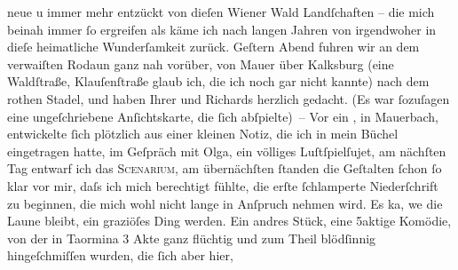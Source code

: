 \begin{ledgroupsized}[t]{13cm}
               neue u immer mehr entzückt von dieſen Wiener
                  Wald Landſchaften – die mich beinah immer ſo ergreifen als käme ich nach
               langen Jahren von irgendwoher in dieſe heimatliche Wunderſamkeit zurück. Geſtern
               Abend fuhren wir an dem verwaiſten Ro{\pb}daun ganz nah vorüber, von Mauer über Kalksburg (eine
               Waldſtraße, Klauſenſtraße glaub ich, die ich
               noch gar nicht kannte) nach dem rothen Stadel,
               und haben Ihrer und Richards herzlich gedacht.
               (Es war ſozuſagen eine ungeſchriebene Anſichtskarte, die ſich abſpielte) –\pend
           \pstart
           Vor ein \label{K_L01422-2v}\label{K_L01422-2h}, in Mauerbach, entwickelte ſich plötzlich
               aus einer kleinen Notiz, die ich in mein Büchel eingetragen hatte, im Geſpräch mit
                  Olga, ein völliges Luſtſpielſujet, am nächſten Tag ent{\pb}warf ich das \textsc{Scenarium}, am
               übernächſten ſtanden die Geſtalten ſchon ſo klar vor mir, daſs ich mich berechtigt
               fühlte, die erſte ſchlamperte Niederſchrift zu beginnen, die mich wohl nicht lange in
               Anſpruch nehmen wird. Es ka{\geminationn}, we{\geminationn} die Laune bleibt, ein graziöſes Ding werden. Ein
               andres Stück, eine 5aktige
                  Komödie, von der in Taormina 3 Akte ganz
               flüchtig und zum Theil blödſinnig hingeſchmiſſen wurden, die ſich aber hier,

\end{ledgroupsized}
